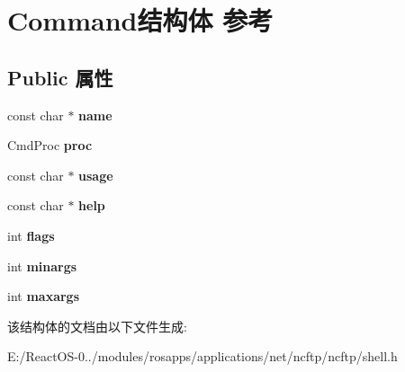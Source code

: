 \hypertarget{struct_command}{}\section{Command结构体 参考}
\label{struct_command}
\subsection*{Public 属性}
\begin{DoxyCompactItemize}
\item 
\mbox{\label{struct_command_aaac7db0461198bc84c6bb01e64ae82e3}} 
const char $\ast$ {\bfseries name}
\item 
\mbox{\label{struct_command_a8d16e1b2cb7077ab00564db6be2041f8}} 
Cmd\+Proc {\bfseries proc}
\item 
\mbox{\label{struct_command_a3f02dd2595cc05f869e252c17a049881}} 
const char $\ast$ {\bfseries usage}
\item 
\mbox{\label{struct_command_a3176988aea9747a725c9e4b1b2e76e7d}} 
const char $\ast$ {\bfseries help}
\item 
\mbox{\label{struct_command_a69c87fe228e9ec7e60f6015171d1b522}} 
int {\bfseries flags}
\item 
\mbox{\label{struct_command_a3d428d8070cca79b2357880d18926276}} 
int {\bfseries minargs}
\item 
\mbox{\label{struct_command_a188beea5c1ea356c849c315a07edda58}} 
int {\bfseries maxargs}
\end{DoxyCompactItemize}


该结构体的文档由以下文件生成\+:\begin{DoxyCompactItemize}
\item 
E\+:/\+React\+O\+S-\/0../modules/rosapps/applications/net/ncftp/ncftp/shell.\+h\end{DoxyCompactItemize}
